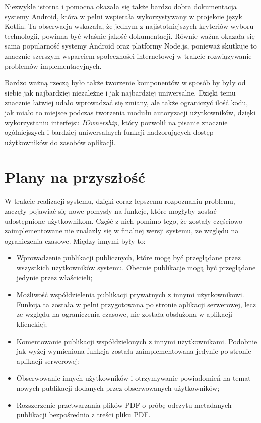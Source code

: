 \documentclass[a4paper,12pt,twoside,openany]{report}
\begin{document}
Niezwykle istotna i pomocna okazała się także bardzo dobra dokumentacja systemy Android, która w pełni wspierała wykorzystywany w projekcie język Kotlin. Ta obserwacja wskazała, że jednym z najistotniejszych kryteriów wyboru technologii, powinna być właśnie jakość dokumentacji. Równie ważna okazała się sama popularność systemy Android oraz platformy Node.js, ponieważ skutkuje to znacznie szerszym wsparciem społeczności internetowej w trakcie rozwiązywanie problemów implementacyjnych. 

Bardzo ważną rzeczą było także tworzenie komponentów w sposób by były od siebie jak najbardziej niezależne i jak najbardziej uniwersalne. Dzięki temu znacznie łatwiej udało wprowadzać się zmiany, ale także ograniczyć ilość kodu, jak miało to miejsce podczas tworzenia modułu autoryzacji użytkowników, dzięki wykorzystaniu interfejsu \textit{IOwnership}, który pozwolił na pisanie znacznie ogólniejszych i bardziej uniwersalnych funkcji nadzorujących dostęp użytkowników do zasobów aplikacji. 

\section{Plany na przyszłość}
W trakcie realizacji systemu, dzięki coraz lepszemu rozpoznaniu problemu, zaczęły pojawiać się nowe pomysły na funkcje, które mogłyby zostać udostępnione użytkownikom. Część z nich pomimo tego, że zostały częściowo zaimplementowane nie znalazły się w finalnej wersji systemu, ze względu na ograniczenia czasowe. Między innymi były to:
\begin{itemize}
	\item Wprowadzenie publikacji publicznych, które mogę być przeglądane przez wszystkich użytkowników systemu. Obecnie publikacje mogą być przeglądane jedynie przez właścicieli;
	\item Możliwość współdzielenia publikacji prywatnych z innymi użytkownikowi. Funkcja ta została w pełni przygotowana po stronie aplikacji serwerowej, lecz ze względu na ograniczenia czasowe, nie została obsłużona w aplikacji klienckiej;
	\item Komentowanie publikacji współdzielonych z innymi użytkownikami. Podobnie jak wyżej wymieniona funkcja została zaimplementowana jedynie po stronie aplikacji serwerowej;
	\item Obserwowanie innych użytkowników i otrzymywanie powiadomień na temat nowych publikacji dodanych przez obserwowanych użytkowników;
	\item Rozszerzenie przetwarzania plików PDF o próbę odczytu metadanych publikacji bezpośrednio z treści pliku PDF.
\end{itemize}
\end{document}
